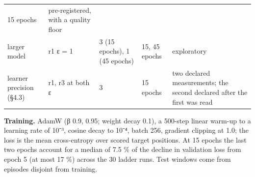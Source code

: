 \documentclass[10pt]{article}
\begin{document}
\begin{longtable}[]{@{}lllll@{}}
\begin{minipage}[t]{0.17\columnwidth}
15 epochs\strut
\end{minipage} & \begin{minipage}[t]{0.17\columnwidth}\raggedright
pre-registered, with a quality floor\strut
\end{minipage}\tabularnewline
\begin{minipage}[t]{0.17\columnwidth}\raggedright
larger model\strut
\end{minipage} & \begin{minipage}[t]{0.17\columnwidth}\raggedright
r1 ε = 1\strut
\end{minipage} & \begin{minipage}[t]{0.17\columnwidth}\raggedright
3 (15 epochs), 1 (45 epochs)\strut
\end{minipage} & \begin{minipage}[t]{0.17\columnwidth}\raggedright
15, 45 epochs\strut
\end{minipage} & \begin{minipage}[t]{0.17\columnwidth}\raggedright
exploratory\strut
\end{minipage}\tabularnewline
\begin{minipage}[t]{0.17\columnwidth}\raggedright
learner precision (§4.3)\strut
\end{minipage} & \begin{minipage}[t]{0.17\columnwidth}\raggedright
r1, r3 at both ε\strut
\end{minipage} & \begin{minipage}[t]{0.17\columnwidth}\raggedright
3\strut
\end{minipage} & \begin{minipage}[t]{0.17\columnwidth}\raggedright
15 epochs\strut
\end{minipage} & \begin{minipage}[t]{0.17\columnwidth}\raggedright
two declared measurements; the second declared after the first was read\strut
\end{minipage}\tabularnewline
\bottomrule
\end{longtable}

\textbf{Training.} AdamW (β 0.9, 0.95; weight decay 0.1), a 500-step linear warm-up to a learning rate of 10⁻³, cosine decay
to 10⁻⁴, batch 256, gradient clipping at 1.0; the loss is the mean cross-entropy over scored target positions. At 15
epochs the last two epochs account for a median of 7.5 \% of the decline in validation loss from epoch 5 (at most 17 \%)
across the 30 ladder runs. Test windows come from episodes disjoint from training.
\end{document}
